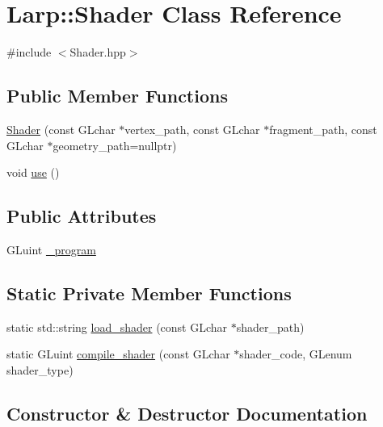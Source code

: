 \hypertarget{classLarp_1_1Shader}{}\section{Larp\+:\+:Shader Class Reference}
\label{classLarp_1_1Shader}


{\ttfamily \#include $<$Shader.\+hpp$>$}

\subsection*{Public Member Functions}
\begin{DoxyCompactItemize}
\item 
\hyperlink{classLarp_1_1Shader_a02cd13e09037075d62c3566e2fc797ab}{Shader} (const G\+Lchar $\ast$vertex\+\_\+path, const G\+Lchar $\ast$fragment\+\_\+path, const G\+Lchar $\ast$geometry\+\_\+path=nullptr)
\item 
void \hyperlink{classLarp_1_1Shader_a781750e2455007153ea226c0928bc24a}{use} ()
\end{DoxyCompactItemize}
\subsection*{Public Attributes}
\begin{DoxyCompactItemize}
\item 
G\+Luint \hyperlink{classLarp_1_1Shader_ae900fbc780cccf1e37eebee294caa69f}{\+\_\+program}
\end{DoxyCompactItemize}
\subsection*{Static Private Member Functions}
\begin{DoxyCompactItemize}
\item 
static std\+::string \hyperlink{classLarp_1_1Shader_abf92153766512f9180d0d85062625446}{load\+\_\+shader} (const G\+Lchar $\ast$shader\+\_\+path)
\item 
static G\+Luint \hyperlink{classLarp_1_1Shader_ab2b03a9fe1ae3073e87268c7374af3f7}{compile\+\_\+shader} (const G\+Lchar $\ast$shader\+\_\+code, G\+Lenum shader\+\_\+type)
\end{DoxyCompactItemize}


\subsection{Constructor \& Destructor Documentation}
